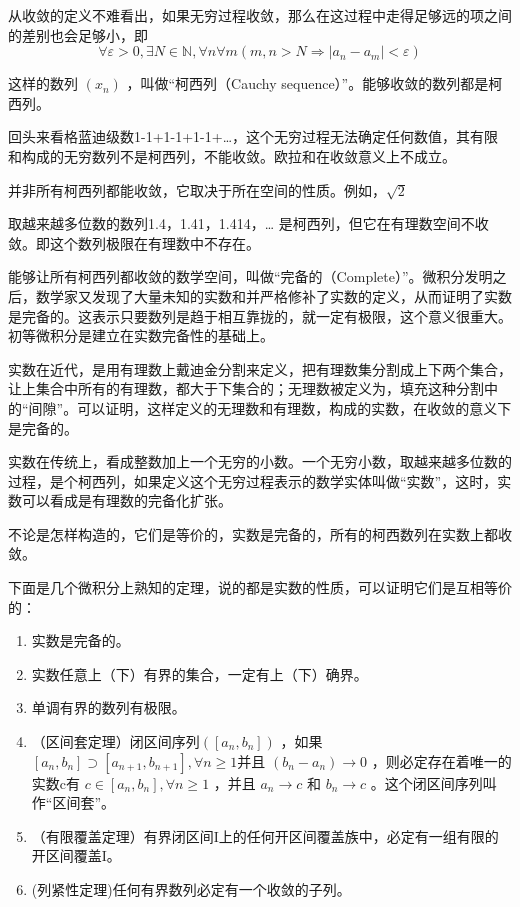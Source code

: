 从收敛的定义不难看出，如果无穷过程收敛，那么在这过程中走得足够远的项之间的差别也会足够小，即
\begin{equation}
	\forall \varepsilon > 0, \exists N \in \mathbb{N},\forall n \forall m ( m,n>N \Rightarrow |a_n-a_m| < \varepsilon )
\end{equation}

这样的数列 $ (x_n) $ ，叫做``柯西列（Cauchy sequence）''。能够收敛的数列都是柯西列。

回头来看格蓝迪级数1-1+1-1+1-1+…，这个无穷过程无法确定任何数值，其有限和构成的无穷数列不是柯西列，不能收敛。欧拉和在收敛意义上不成立。

并非所有柯西列都能收敛，它取决于所在空间的性质。例如，$ \sqrt{2} $

取越来越多位数的数列1.4，1.41，1.414，… 是柯西列，但它在有理数空间不收敛。即这个数列极限在有理数中不存在。

能够让所有柯西列都收敛的数学空间，叫做``完备的（Complete）''。微积分发明之后，数学家又发现了大量未知的实数和并严格修补了实数的定义，从而证明了实数是完备的。这表示只要数列是趋于相互靠拢的，就一定有极限，这个意义很重大。初等微积分是建立在实数完备性的基础上。

实数在近代，是用有理数上戴迪金分割来定义，把有理数集分割成上下两个集合，让上集合中所有的有理数，都大于下集合的；无理数被定义为，填充这种分割中的``间隙''。可以证明，这样定义的无理数和有理数，构成的实数，在收敛的意义下是完备的。

实数在传统上，看成整数加上一个无穷的小数。一个无穷小数，取越来越多位数的过程，是个柯西列，如果定义这个无穷过程表示的数学实体叫做``实数''，这时，实数可以看成是有理数的完备化扩张。

不论是怎样构造的，它们是等价的，实数是完备的，所有的柯西数列在实数上都收敛。

下面是几个微积分上熟知的定理，说的都是实数的性质，可以证明它们是互相等价的：

\kaishu
\setlength{\leftskip}{1em}
\begin{enumerate}
	\item 实数是完备的。
	
	\item 实数任意上（下）有界的集合，一定有上（下）确界。
	
	\item 单调有界的数列有极限。
	
	\item （区间套定理）闭区间序列$ ([a_n, b_n]) $	，如果$ [a_n, b_n]\supset [a_{n+1}, b_{n+1}], \forall n \ge 1  $并且 $ (b_n-a_n)\rightarrow 0 $ ，则必定存在着唯一的实数c有 $ c \in [a_n, b_n],\forall n \ge 1 $ ，并且 $ a_n \rightarrow c $ 和 $ b_n \rightarrow c $ 。这个闭区间序列叫作``区间套''。
	
	\item （有限覆盖定理）有界闭区间I上的任何开区间覆盖族中，必定有一组有限的开区间覆盖I。
	
	\item (列紧性定理)任何有界数列必定有一个收敛的子列。
\end{enumerate}

